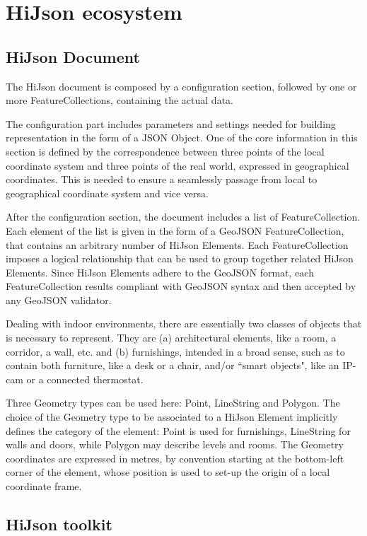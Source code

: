 \documentclass{sig-alternate}
\begin{document}
\section{HiJson ecosystem}


\subsection{HiJson Document}

The HiJson document is composed by a configuration section, followed by one or more FeatureCollections, containing the actual data.


The configuration part includes parameters and settings needed for building representation in the form of a JSON Object. One of the core information in this section is defined by the correspondence between three points of the local coordinate system and three points of the real world, expressed in geographical coordinates. This is needed to ensure a seamlessly passage from local to geographical coordinate system and vice versa.

After the configuration section, the document includes a list of FeatureCollection. 
Each element of the list is given in the form of a GeoJSON FeatureCollection, that contains an arbitrary number of HiJson Elements. Each FeatureCollection imposes a logical relationship that can be used to group together related HiJson Elements. Since HiJson Elements adhere to the GeoJSON format, each FeatureCollection results compliant with GeoJSON syntax and then accepted by any GeoJSON validator. 

Dealing with indoor environments, there are essentially two classes of objects that is necessary to represent. They are (a) architectural elements, like a room, a corridor, a wall, etc. and (b) furnishings, intended in a broad sense, such as to contain both furniture, like a desk or a chair, and/or ``smart objects", like an IP-cam or a connected thermostat.

Three Geometry types can be used here: Point, LineString and Polygon. The choice of the Geometry type to be associated to a HiJson Element implicitly defines the category of the element: Point is used for furnishings, LineString for walls and doors, while Polygon may describe levels and rooms.
The Geometry coordinates are expressed in metres, by convention starting at the bottom-left corner of the element, whose position is used to set-up the origin of a local coordinate frame. 

\subsection{HiJson toolkit}
\end{document}
